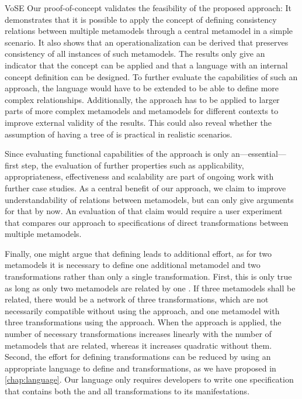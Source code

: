 \begin{copiedFrom}{VoSE}
Our proof-of-concept validates the feasibility of the proposed \commonalities approach: 
It demonstrates that it is possible to apply the concept of defining consistency relations between multiple metamodels  through a central metamodel in a simple scenario. It also shows that an operationalization can be derived that preserves consistency of all instances of such metamodels.
The results only give an indicator that the \commonalities concept can be applied and that a language with an internal concept definition can be designed.
To further evaluate the capabilities of such an approach, the language would have to be extended to be able to define more complex relationships.
Additionally, the approach has to be applied to larger parts of more complex metamodels and metamodels for different contexts to improve external validity of the results.
This could also reveal whether the assumption of having a tree of \commonalities is practical in realistic scenarios.

Since evaluating functional capabilities of the approach is only an---essential---first step, the evaluation of further properties such as applicability, appropriateness, effectiveness and scalability are part of ongoing work with further case studies.
As a central benefit of our approach, we claim to improve understandability of relations between metamodels, but can only give arguments for that by now.
An evaluation of that claim would require a user experiment that compares our approach to specifications of direct transformations between multiple metamodels.

Finally, one might argue that defining \conceptmetamodels leads to additional effort, as for two metamodels it is necessary to define one additional metamodel and two transformations rather than only a single transformation.
First, this is only true as long as only two metamodels are related by one \conceptmetamodel. 
If three metamodels shall be related, there would be a network of three transformations, which are not necessarily compatible without using the \commonalities approach, and one metamodel with three transformations using the \commonalities approach.
When the \commonalities approach is applied, the number of necessary transformations increases linearly with the number of metamodels that are related, whereas it increases quadratic without them.
Second, the effort for defining transformations can be reduced by using an appropriate language to define \conceptmetamodels and transformations, as we have proposed in \autoref{chap:language}. Our language only requires developers to write one specification that contains both the \conceptmetamodel and all transformations to its manifestations.


\end{copiedFrom} %


